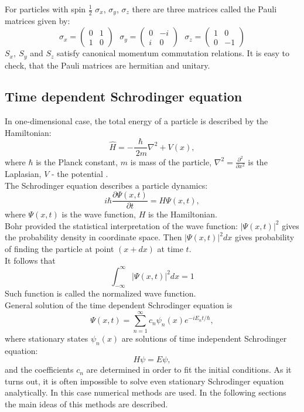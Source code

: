 \documentclass[a4paper, 11pt]{article}
\begin{document}
For  particles with spin $\frac{1}{2}$  $\sigma_x$, $\sigma_y$, $\sigma_z$ there are three matrices called  the Pauli matrices given by:
$$\sigma_x = 
\begin{pmatrix}
0 & 1 \\
1 & 0
\end{pmatrix} ~~~
\sigma_y = 
\begin{pmatrix}
0 & -i \\
i & 0
\end{pmatrix} ~~~
\sigma_z = 
\begin{pmatrix}
1 & 0\\
0 & -1
\end{pmatrix}$$
$S_x, ~S_y$ and $S_z$ satisfy  canonical momentum commutation relations. It is easy to check, that the Pauli matrices are hermitian and unitary.

\subsection{Time dependent Schrodinger equation} 
In one-dimensional case, the total energy of a particle is described by the Hamiltonian: 
\begin{equation}\label{hamiltonian}
	\hat{H} =- \dfrac{\hbar}{\ {2}{m}} \nabla^2  + V(x),
\end{equation}
where $\hbar$ is the Planck constant, ${m}$ is  mass of the particle, $\nabla^2 = \frac{\partial^2}{\partial x^2}$ is the Laplasian,  $V$ - the potential .\\
The Schrodinger equation describes a particle dynamics:
\begin{equation}\label{schr_eq}
	i \hbar \frac{\partial \Psi(x, t)}{\partial t} = H \Psi(x,t),
\end{equation}
where $\Psi(x, t)$ is the wave function, $H$ is the Hamiltonian.\\
Bohr provided the statistical interpretation of the wave function: $|\Psi(x,t)|^2 $ gives the probability density in coordinate space. Then $|\Psi(x,t)|^2 dx $ gives probability of finding the particle at point $(x+dx)$ at time $t.$\\
It follows that 
$$\int_{-\infty}^\infty |\Psi(x,t)|^2 dx = 1$$
Such function is called the normalized wave function.\\
General solution of the time dependent Schrodinger equation is $$\Psi(x,t) = \sum_{n=1}^\infty c_n \psi_n (x) e^{-i E_nt/ \hbar},$$  where stationary states  $ \psi_n (x)$ are solutions of time independent Schrodinger equation:
\begin{equation}\label{t-indep}
	H \psi = E \psi,
\end{equation}
and the coefficients $c_n$  are determined in order to fit the initial conditions.
As it turns out, it is often impossible to solve even stationary Schrodinger equation analytically. In this case numerical methods are used. In the following sections the main ideas of this methods are described.
\end{document}
